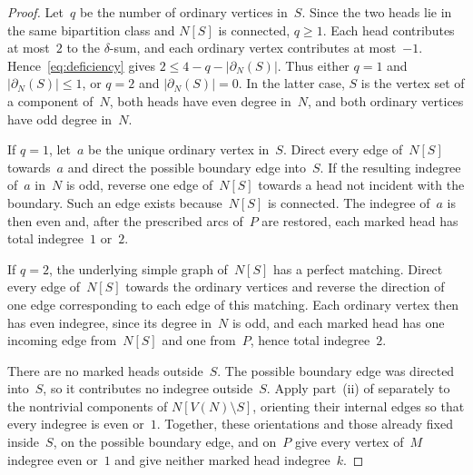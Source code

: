 \documentclass[10pt,a4paper]{amsart}
\begin{document}
\begin{proof}
  Let~$q$ be the number of ordinary vertices in~$S$.
  Since the two heads lie in the same bipartition class and $N[S]$ is
  connected, $q \ge 1$.
  Each head contributes at most~$2$ to the $\delta$-sum, and each ordinary
  vertex contributes at most~$-1$. 
  Hence~\eqref{eq:deficiency} gives $2 \le 4 - q - |\partial_N(S)|$.
  Thus either $q = 1$ and $|\partial_N(S)| \le 1$, or $q = 2$ and
  $|\partial_N(S)| = 0$.
  In the latter case, $S$ is the vertex set of a component of~$N$, both heads
  have even degree in~$N$, and both ordinary vertices have odd degree in~$N$.

  If $q = 1$, let~$a$ be the unique ordinary vertex in~$S$.
  Direct every edge of~$N[S]$ towards~$a$ and direct the possible boundary edge
  into~$S$.
  If the resulting indegree of~$a$ in~$N$ is odd, reverse one edge of~$N[S]$
  towards a head not incident with the boundary.
  Such an edge exists because~$N[S]$ is connected. 
  The indegree of~$a$ is then even and, after the prescribed arcs of~$P$ are
  restored, each marked head has total indegree~$1$ or~$2$.

  If $q = 2$, the underlying simple graph of~$N[S]$ has a perfect matching.
  Direct every edge of~$N[S]$ towards the ordinary vertices and reverse the
  direction of one edge corresponding to each edge of this matching. 
  Each ordinary vertex then has even indegree, since its degree in~$N$ is odd,
  and each marked head has one incoming edge from~$N[S]$ and one from~$P$,
  hence total indegree~$2$.

  There are no marked heads outside~$S$. 
  The possible boundary edge was directed into~$S$, so it contributes no
  indegree outside~$S$.
  Apply part~(ii) of  separately to the nontrivial
  components of $N[V(N) \setminus S]$, orienting their internal edges so that
  every indegree is even or~$1$.
  Together, these orientations and those already fixed inside~$S$, on the
  possible boundary edge, and on~$P$ give every vertex of~$M$ indegree even
  or~$1$ and give neither marked head indegree~$k$.
\end{proof}
\end{document}
